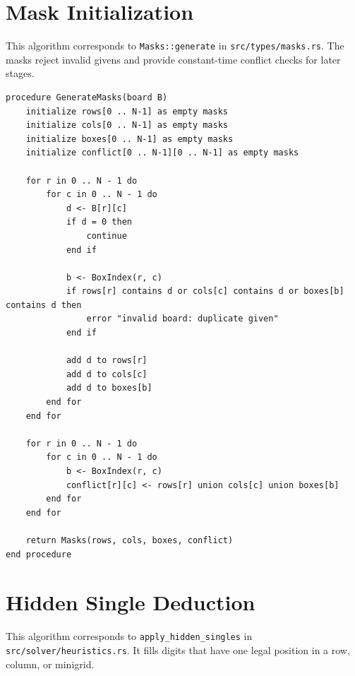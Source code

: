 \documentclass[11pt,a4paper]{article}
\begin{document}
\section{Mask Initialization}

This algorithm corresponds to \texttt{Masks::generate} in \texttt{src/types/masks.rs}. The masks reject invalid givens and provide constant-time conflict checks for later stages.

\begin{lstlisting}[caption={Generate row, column, box, and conflict masks}]
procedure GenerateMasks(board B)
    initialize rows[0 .. N-1] as empty masks
    initialize cols[0 .. N-1] as empty masks
    initialize boxes[0 .. N-1] as empty masks
    initialize conflict[0 .. N-1][0 .. N-1] as empty masks

    for r in 0 .. N - 1 do
        for c in 0 .. N - 1 do
            d <- B[r][c]
            if d = 0 then
                continue
            end if

            b <- BoxIndex(r, c)
            if rows[r] contains d or cols[c] contains d or boxes[b] contains d then
                error "invalid board: duplicate given"
            end if

            add d to rows[r]
            add d to cols[c]
            add d to boxes[b]
        end for
    end for

    for r in 0 .. N - 1 do
        for c in 0 .. N - 1 do
            b <- BoxIndex(r, c)
            conflict[r][c] <- rows[r] union cols[c] union boxes[b]
        end for
    end for

    return Masks(rows, cols, boxes, conflict)
end procedure
\end{lstlisting}

\section{Hidden Single Deduction}

This algorithm corresponds to \texttt{apply\_hidden\_singles} in \texttt{src/solver/heuristics.rs}. It fills digits that have one legal position in a row, column, or minigrid.
\end{document}
